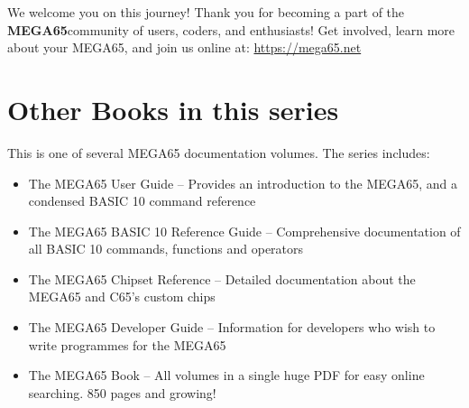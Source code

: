 We welcome you on this journey! Thank you for becoming a part of the {\bf MEGA65}community of users, coders, and enthusiasts! Get involved, learn more about your MEGA65, and join us online at: \url{https://mega65.net}


\section{Other Books in this series}

This is one of several MEGA65 documentation volumes.  The series includes:

\begin{itemize}
	\item The MEGA65 User Guide -- Provides an introduction to the MEGA65, and a condensed BASIC 10 command reference
	\item The MEGA65 BASIC 10 Reference Guide -- Comprehensive documentation of all BASIC 10 commands, functions and operators
	\item The MEGA65 Chipset Reference -- Detailed documentation about the MEGA65 and C65's custom chips
	\item The MEGA65 Developer Guide -- Information for developers who wish to write programmes for the MEGA65
	\item The MEGA65 Book -- All volumes in a single huge PDF for easy online searching. 850 pages and growing!
\end{itemize}
